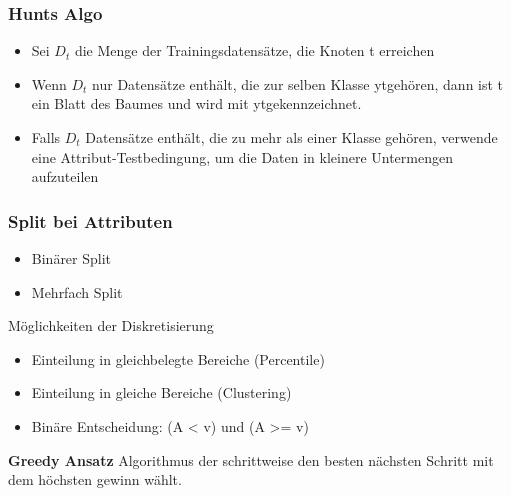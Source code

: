 \documentclass[a4paper]{article}
\begin{document}
\begin{landscape}
\begin{multicols}{3}
        \subsubsection{Hunts Algo}
        \begin{itemize}[noitemsep,nolistsep]
            \item Sei $D_t$ die Menge der Trainingsdatensätze, die Knoten t erreichen
            \item Wenn $D_t$ nur Datensätze enthält, die zur selben Klasse ytgehören, dann ist t ein Blatt des Baumes und wird mit ytgekennzeichnet.
            \item Falls $D_t$ Datensätze enthält, die zu mehr als einer Klasse gehören, verwende eine Attribut-Testbedingung, um die Daten in kleinere Untermengen aufzuteilen
        \end{itemize}

        \subsubsection{Split bei Attributen}
        \begin{itemize}[noitemsep,nolistsep]
            \item Binärer Split
            \item Mehrfach Split
        \end{itemize}
        Möglichkeiten der Diskretisierung
        \begin{itemize}[noitemsep,nolistsep]
            \item Einteilung in gleichbelegte Bereiche (Percentile)
            \item Einteilung in gleiche Bereiche (Clustering)
            \item Binäre Entscheidung: (A < v) und (A >= v)
        \end{itemize}
        \textbf{Greedy Ansatz}
        Algorithmus der schrittweise den besten nächsten Schritt mit dem höchsten gewinn wählt.


\end{multicols}
\end{landscape}
\end{document}
